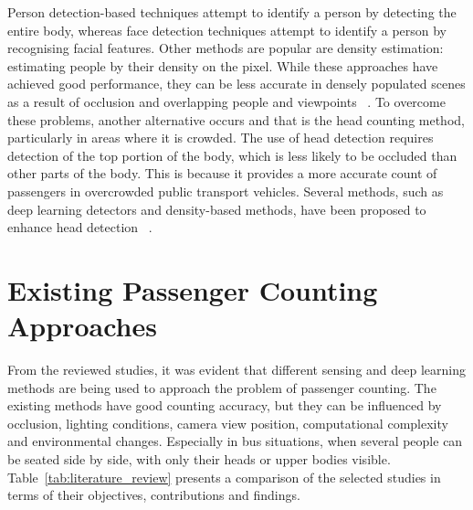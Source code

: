 Person detection-based techniques attempt to identify a person by detecting the entire body, whereas face detection techniques attempt to identify a person by recognising facial features. Other methods are popular are density estimation: estimating people by their density on the pixel. While these approaches have achieved good performance, they can be less accurate in densely populated scenes as a result of occlusion and overlapping people and viewpoints ~\cite{Hsu2020}. To overcome these problems, another alternative occurs and that is the head counting method, particularly in areas where it is crowded. The use of head detection requires detection of the top portion of the body, which is less likely to be occluded than other parts of the body. This is because it provides a more accurate count of passengers in overcrowded public transport vehicles. Several methods, such as deep learning detectors and density-based methods, have been proposed to enhance head detection ~\cite{Claire2021}. 

\section{Existing Passenger Counting Approaches}

From the reviewed studies, it was evident that different sensing and deep learning methods are being used to approach the problem of passenger counting. The existing methods have good counting accuracy, but they can be influenced by occlusion, lighting conditions, camera view position, computational complexity and environmental changes. Especially in bus situations, when several people can be seated side by side, with only their heads or upper bodies visible. Table~\ref{tab:literature_review} presents a comparison of the selected studies in terms of their objectives, contributions and findings.

